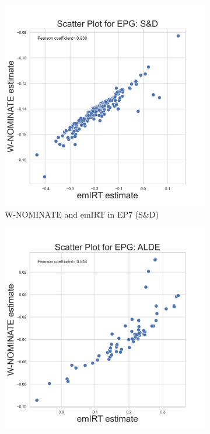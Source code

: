 \documentclass[a4paper,12pt]{report}
\begin{document}
    \begin{figure}[H]
        \centering
        \begin{subfigure}[b]{0.48\textwidth}
            \centering
            \includegraphics[width=\textwidth]{Graphs/ScatterEMWNOMINATE_7_EPG_S&D}
            \caption{W-NOMINATE and emIRT in EP7 (S\&D)}
            \label{fig:WNOMINATE_S&DSCATTER_7}
        \end{subfigure}
        \hfill
        \begin{subfigure}[b]{0.48\textwidth}
            \centering
            \includegraphics[width=\textwidth]{Graphs/ScatterEMWNOMINATE_8_EPG_ALDE}

\end{subfigure}
\end{figure}
\end{document}
